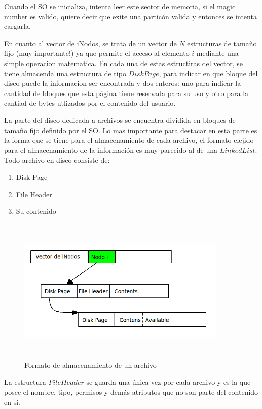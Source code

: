 \documentclass[english]{article}
\begin{document}
Cuando el SO se inicializa, intenta leer este sector de memoria, si
el magic number es valido, quiere decir que exite una particón valida
y entonces se intenta cargarla.

En cuanto al vector de iNodos, se trata de un vector de $N$ estructuras
de tamaño fijo (muy importante!) ya que permite el acceso al elemento
$i$ mediante una simple operacion matematica. En cada una de estas
estructiras del vector, se tiene almacenda una estructura de tipo
$DiskPage$, para indicar en que bloque del disco puede la informacion
ser encontrada y dos enteros: uno para indicar la cantidad de bloques
que esta página tiene reservada para su uso y otro para la cantiad
de bytes utlizados por el contenido del usuario.

La parte del disco dedicada a archivos se encuentra dividida en bloques
de tamaño fijo definido por el SO. Lo mas importante para destacar
en esta parte es la forma que se tiene para el almacenamiento de cada
archivo, el formato elejido para el almacenamiento de la información
es muy parecido al de una $LinkedList$. Todo archivo en disco consiste
de:
\begin{enumerate}
\item Disk Page
\item File Header
\item Su contenido
\end{enumerate}

\begin{figure}[H]
\begin{center}
\includegraphics[width=10cm,height=7cm,keepaspectratio]{Archivo}

\caption{Formato de almacenamiento de un archivo}
\end{center}
\end{figure}


La estructura $File$$Header$ se guarda una única vez por cada archivo
y es la que posee el nombre, tipo, permisos y demás atributos que
no son parte del contenido en si.\\
\end{document}
